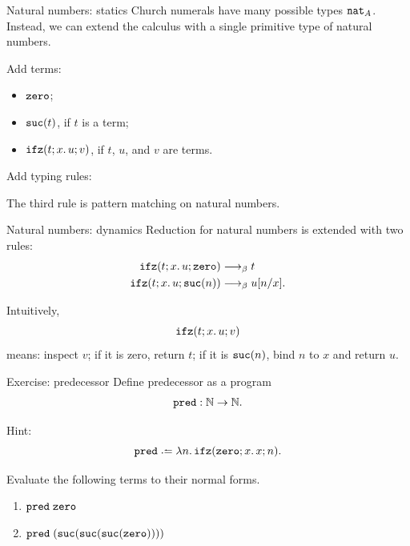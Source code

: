 \begin{frame}{Natural numbers: statics}
  Church numerals have many possible types $\mathtt{nat}_A$.  Instead, we can extend
  the calculus with a single primitive type of natural numbers.

  Add terms:
  \begin{itemize}
    \item $\mathtt{zero}$;
    \item $\mathtt{suc}(t)$, if $t$ is a term;
    \item $\mathtt{ifz}(t; x.\,u; v)$, if $t$, $u$, and $v$ are terms.
  \end{itemize}

  Add typing rules:

  The third rule is pattern matching on natural numbers.
\end{frame}

\begin{frame}{Natural numbers: dynamics}
  Reduction for natural numbers is extended with two rules:
  \begin{align*}
    \mathtt{ifz}(t; x.\,u; \mathtt{zero}) &\longrightarrow_{\beta} t \\
    \mathtt{ifz}(t; x.\,u; \mathtt{suc}(n)) &\longrightarrow_{\beta} u[{n}/{x}].
  \end{align*}

  \vfill

  Intuitively,
  \[
    \mathtt{ifz}(t; x.\,u; v)
  \]
  means: inspect $v$; if it is zero, return $t$; if it is $\mathtt{suc}(n)$, bind
  $n$ to $x$ and return $u$.
\end{frame}

\begin{frame}{Exercise: predecessor}
  Define predecessor as a program
  \[
    \mathtt{pred} : \mathbb{N} \to \mathbb{N}.
  \]

  Hint:
  \[
    \pred \defeq \lambda n.\,\ifz(\zero; x.\,x; n).
  \]

  Evaluate the following terms to their normal forms.
  \begin{enumerate}
    \item $\mathtt{pred}\;\mathtt{zero}$
    \item $\mathtt{pred}\;(\mathtt{suc}(\mathtt{suc}(\mathtt{suc}(\mathtt{zero}))))$
  \end{enumerate}
\end{frame}

